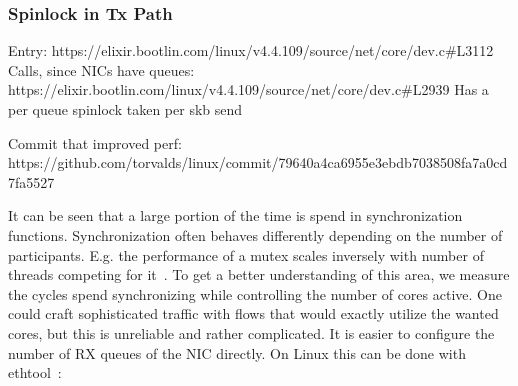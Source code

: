 \documentclass[IN,11pt,twoside,openright,master,english]{tumthesis}
\begin{document}
\begin{table}
	\centering
	\caption{Top 10 most cycle consuming functions in Linux router with 4 queues}
	\label{tab:linux-stacktrace}
\end{table}

\subsubsection{Spinlock in Tx Path}
Entry: https://elixir.bootlin.com/linux/v4.4.109/source/net/core/dev.c\#L3112
Calls, since NICs have queues: https://elixir.bootlin.com/linux/v4.4.109/source/net/core/dev.c\#L2939
Has a per queue spinlock taken per skb send

Commit that improved perf: https://github.com/torvalds/linux/commit/79640a4ca6955e3ebdb7038508fa7a0cd7fa5527

It can be seen that a large portion of the time is spend in synchronization functions.
Synchronization often behaves differently depending on the number of participants. E.g. the performance of a mutex scales inversely with number of threads competing for it~\cite{}. To get a better understanding of this area, we measure the cycles spend synchronizing while controlling the number of cores active.
One could craft sophisticated traffic with flows that would exactly utilize the wanted cores, but this is unreliable and rather complicated. It is easier to configure the number of RX queues of the NIC directly. On Linux this can be done with ethtool~\cite{}:
\end{document}
